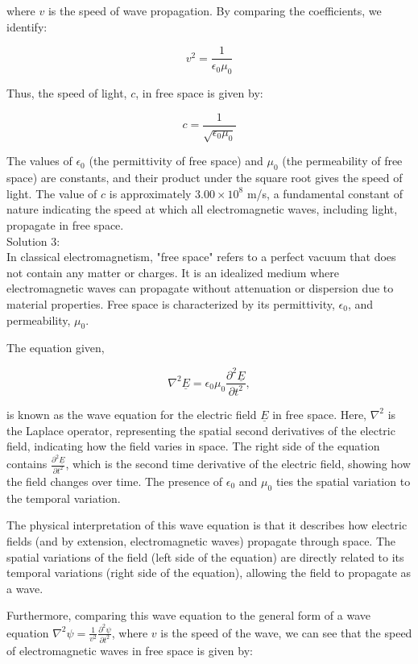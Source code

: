 \documentclass[a4paper,11pt]{article}
\begin{document}
where \(v\) is the speed of wave propagation. By comparing the coefficients, we identify:

\[
v^2 = \frac{1}{\epsilon_{0}\mu_{0}}
\]

Thus, the speed of light, \(c\), in free space is given by:

\[
c = \frac{1}{\sqrt{\epsilon_{0}\mu_{0}}}
\]

The values of \(\epsilon_{0}\) (the permittivity of free space) and \(\mu_{0}\) (the permeability of free space) are constants, and their product under the square root gives the speed of light. The value of \(c\) is approximately \(3.00 \times 10^8\) m/s, a fundamental constant of nature indicating the speed at which all electromagnetic waves, including light, propagate in free space. \\

\noindent Solution 3: \\

In classical electromagnetism, "free space" refers to a perfect vacuum that does not contain any matter or charges. It is an idealized medium where electromagnetic waves can propagate without attenuation or dispersion due to material properties. Free space is characterized by its permittivity, \(\epsilon_0\), and permeability, \(\mu_0\).

The equation given,

\[
\nabla^{2}\underline{E} =  \epsilon_{0}\mu_{0}\frac{\partial^2 \underline{E}}{\partial t^{2}},
\]

is known as the wave equation for the electric field \(\underline{E}\) in free space. Here, \(\nabla^{2}\) is the Laplace operator, representing the spatial second derivatives of the electric field, indicating how the field varies in space. The right side of the equation contains \(\frac{\partial^2 \underline{E}}{\partial t^{2}}\), which is the second time derivative of the electric field, showing how the field changes over time. The presence of \(\epsilon_0\) and \(\mu_0\) ties the spatial variation to the temporal variation.

The physical interpretation of this wave equation is that it describes how electric fields (and by extension, electromagnetic waves) propagate through space. The spatial variations of the field (left side of the equation) are directly related to its temporal variations (right side of the equation), allowing the field to propagate as a wave.

Furthermore, comparing this wave equation to the general form of a wave equation \(\nabla^{2}\psi = \frac{1}{v^2}\frac{\partial^2 \psi}{\partial t^{2}}\), where \(v\) is the speed of the wave, we can see that the speed of electromagnetic waves in free space is given by:
\end{document}

